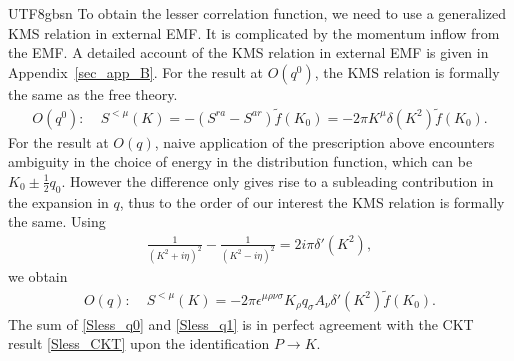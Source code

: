 \documentclass[11pt]{article}\def\baselinestretch{1.4}
\def\d{{\delta}}
\def\e{{\epsilon}}
\def\h{\eta}
\def\p{{\pi}}
\def\m{{\mu}}
\def\n{{\nu}}
\def\r{{\rho}}
\def\s{{\sigma}}
\begin{document}
\begin{CJK}{UTF8}{gbsn}
To obtain the lesser correlation function, we need to use a generalized KMS relation in external EMF. It is complicated by the momentum inflow from the EMF. A detailed account of the KMS relation in external EMF is given in Appendix~\ref{sec_app_B}. For the result at $O(q^0)$, the KMS relation is formally the same as the free theory. 
\begin{align}\label{Sless_q0}
    O(q^0):&\; S^{<\m}(K)=-(S^{ra}-S^{ar})\tilde{f}(K_0)=-2\p K^\m\d(K^2)\tilde{f}(K_0).
\end{align}
For the result at $O(q)$, naive application of the prescription above encounters ambiguity in the choice of energy in the distribution function, which can be $K_0\pm\frac{1}{2}q_0$. However the difference only gives rise to a subleading contribution in the expansion in $q$, thus to the order of our interest the KMS relation is formally the same. Using
\begin{align}
    \frac{1}{(K^2+i\h)^2}-\frac{1}{(K^2-i\h)^2}=2i\p\d'(K^2),
\end{align}
we obtain
\begin{align}\label{Sless_q1}
    O(q):&\; S^{<\m}(K)=-2\p \e^{\m\r\n\s}K_\r q_\s A_\n \d'(K^2)\tilde{f}(K_0).
\end{align}
The sum of \eqref{Sless_q0} and \eqref{Sless_q1} is in perfect agreement with the CKT result \eqref{Sless_CKT} upon the identification $P\to K$.



\end{CJK}
\end{document}
